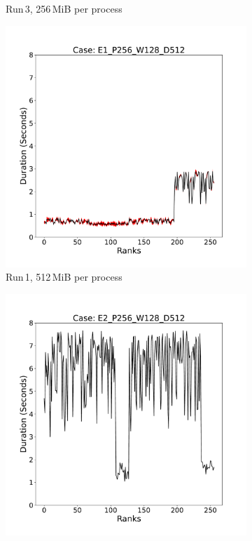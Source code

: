 \begin{figure}
\begin{subfigure}[b]{0.3\textwidth}
         \caption{Run\,3, 256\,MiB per process}
         \label{fig:E3_256}
     \end{subfigure}
     \vfill
          \begin{subfigure}[b]{0.3\textwidth}
         \centering
         \includegraphics[width=\textwidth, height=\textwidth]{figures/E1_P256_W128_D512.pdf}
         \caption{Run\,1, 512\,MiB per process}
         \label{fig:E1_512}
     \end{subfigure}
     \hfill
     \begin{subfigure}[b]{0.3\textwidth}
         \centering
         \includegraphics[width=\textwidth, height=\textwidth]{figures/E2_P256_W128_D512.pdf}

\end{subfigure}
\end{figure}
